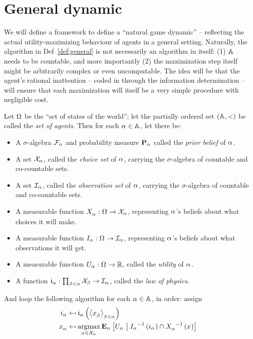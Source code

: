 \documentclass{article}
\begin{document}
\section{General dynamic}
\label{sec:dynamic}

We will define a framework to define a ``natural game dynamic'' -- reflecting the actual utility-maximizing behaviour of agents in a general setting. Naturally, the algorithm in Def~\ref{def:general} is not necessarily an algorithm in itself: (1) $\AGENT$ needs to be countable, and more importantly (2) the maximization step itself might be arbitrarily complex or even uncomputable. The idea will be that the agent's rational inattention -- coded in through the information determination -- will ensure that each maximization will itself be a very simple procedure with negligible cost. 

\begin{definition}\label{def:general}
Let $\OUTCOME$ be the ``set of states of the world''; let the partially ordered set $(\AGENT, <)$ be called the \emph{set of agents}. Then for each $\agent\in\AGENT$, let there be:

\begin{itemize}
    \item A $\sigma$-algebra $\EVENT[\agent]$ and probability measure $\PRO[\agent]$ called the \emph{prior belief} of $\agent$.
    \item A set $\CHOICE[\agent]$, called the \emph{choice set} of $\agent$, carrying the $\sigma$-algebra of countable and co-countable sets. 
    \item A set $\OBS[\agent]$, called the \emph{observation set} of $\agent$, carrying the $\sigma$-algebra of countable and co-countable sets.
    \item A measurable function $\Choice[\agent]:\OUTCOME\to\CHOICE[\agent]$, representing $\agent$'s beliefs about what choices it will make. 
    \item A measurable function $\Obs[\agent]:\OUTCOME\to\OBS[\agent]$, representing $\agent$'s beliefs about what observations it will get.
    \item A measurable function $\Utility[\agent]:\OUTCOME\to\R$, called the \emph{utility} of $\agent$.
    \item A function $\info[\agent]:\prod_{\agentb<\agent}{\CHOICE[\agentb]}\to\OBS[\agent]$, called the \emph{law of physics}.
\end{itemize}

And loop the following algorithm for each $\agent\in\AGENT$, in order: assign 
\begin{align*}
    \obs[\agent] &\assign
    \info[\agent] 
    \bra{\tup{\choice[\agentb]}[\agentb<\agent]} \\
    \choice[\agent] &\assign
    \argmax_{\choice\in\CHOICE[\agent]}
    {
        \Exp[\agent]\ope{
            \Utility[\agent]\con
                \inv{\Obs[\agent]}\bra{\obs[\agent]} \cap
                \inv{\Choice[\agent]}\bra{\choice}
        }
    }
\end{align*} 
\end{definition}
\end{document}
